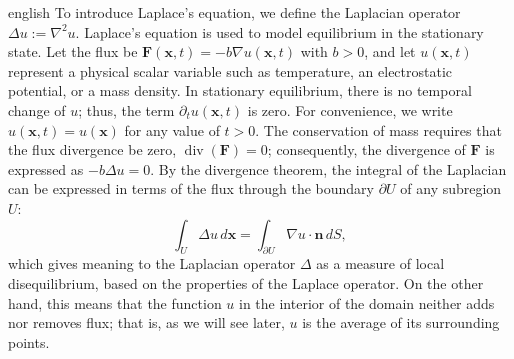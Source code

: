 \begin{hyphenrules}{english}
To introduce Laplace's equation, we define the Laplacian operator $\Delta u:=\nabla^2u$. Laplace's
equation is used to model equilibrium in the stationary state. Let
the flux be $\mathbf{F}(\mathbf{x},t)=-b\nabla u(\mathbf{x},t)$ with $b>0$, and let $u(\mathbf{x},t)$ represent a physical scalar
variable such as temperature, an electrostatic potential, or a mass density. In stationary equilibrium,
there is no temporal change of $u$; thus, the term $\partial_t u(\mathbf{x},t)$ is zero. For convenience, we
write $u(\mathbf{x},t)=u(\mathbf{x})$ for any value of $t>0$.
The conservation of mass requires that the flux divergence be zero, $\operatorname{div}(\mathbf{F})=0$;
consequently, the divergence of $\mathbf{F}$ is expressed as $-b\Delta u=0$. By the divergence theorem, the
integral of the Laplacian can be expressed in terms of the flux through the boundary $\partial U$ of any
subregion $U$:
\begin{equation}
  \int_U\Delta u\,d\mathbf{x}=\int_{\partial U}\nabla u\cdot\mathbf{n}\,d S,
  \label{eq:laplace-flux}
\end{equation}
which gives meaning to the Laplacian operator $\Delta$ as a measure of local disequilibrium, based on the properties of the Laplace operator. On the other hand, this means that the function $u$ in the interior of the domain neither adds nor removes flux;
that is, as we will see later, $u$ is the average of its surrounding points.


\end{hyphenrules}
